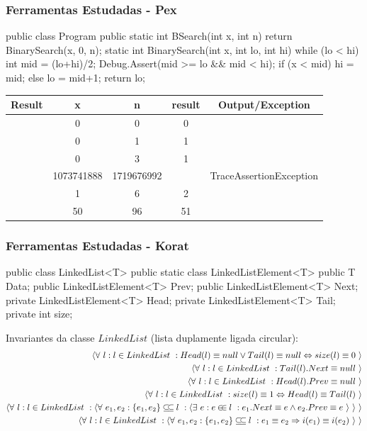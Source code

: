\documentclass{beamer}
\newcommand{\checkK}{\color{green}\checkmark}
\newcommand{\cross}{\color{red}\hspace{-3pt}\ding{55}}
\begin{document}
\begin{frame}[fragile] \frametitle{Ferramentas Estudadas - Pex}
\begin{code}
public class Program {
  public static int BSearch(int x, int n) {
    return BinarySearch(x, 0, n);
  }
  static int BinarySearch(int x, int lo, int hi) {
    while (lo < hi) {
      int mid = (lo+hi)/2;
      Debug.Assert(mid >= lo && mid < hi);
      if (x < mid) { hi = mid; } else { lo = mid+1; }
    }
    return lo;
  }
}
\end{code}

{\tiny \begin{tabular}{|c|c|c|c|c|}\hline
Result & x & n & result & Output/Exception \\\hline
\checkK & 0 & 0 & 0      & \\\hline
\checkK & 0 & 1 & 1      & \\\hline
\checkK & 0 & 3 & 1      & \\\hline
\cross & 1073741888 & 1719676992 & & TraceAssertionException \\\hline
\checkK & 1 & 6 & 2      & \\\hline
\checkK & 50 & 96 & 51      &\\\hline
\end{tabular}
}
\end{frame}

\def\t#1#2#3#4{\langle#1 \ #2 : #3 \ : #4 \ \rangle}
\def\d#1#2#3{\langle#1 \ #2 :: #3 \ \rangle}
\newcommand{\subseteqL}{\mathbin{\subseteq\mkern-4mu\subseteq}}
\newcommand{\inL}{\mathbin{\in\mkern-4mu\in}}

\begin{frame}[fragile]\frametitle{Ferramentas Estudadas - Korat}
\begin{code}
public class LinkedList<T> {
  public static class LinkedListElement<T> {
    public T Data;
    public LinkedListElement<T> Prev;
    public LinkedListElement<T> Next;
  }
  private LinkedListElement<T> Head;
  private LinkedListElement<T> Tail;
  private int size; 
}
\end{code}
Invariantes da classe $LinkedList$ (lista duplamente ligada circular):
{\tiny
\begin{eqnarray}
\t \forall {l} {l \in LinkedList} {Head(l) \equiv null \vee Tail(l) \equiv null \Leftrightarrow size(l) \equiv 0}\\
\t \forall {l} {l \in LinkedList} {Tail(l).Next \equiv null}\\
\t \forall {l} {l \in LinkedList} {Head(l).Prev \equiv null}\\
\t \forall {l} {l \in LinkedList} {size(l) \equiv 1 \Leftrightarrow Head(l) \equiv Tail(l)}\\
\t \forall {l} {l \in LinkedList} {\t \forall {e_1,e_2} {\{e_1,e_2\} \subseteqL l} {\t \exists {e} {e \inL l} {e_1.Next \equiv e \wedge e_2.Prev \equiv e}}\label{eq:linked}}\\
\t \forall {l} {l \in LinkedList} {\t \forall {e_1,e_2} {\{e_1,e_2\} \subseteqL l} {e_1 \equiv e_2 \Rightarrow i(e_1) \equiv i(e_2)}\label{eq:uniq}}
\end{eqnarray}
}
\end{frame}
\end{document}
